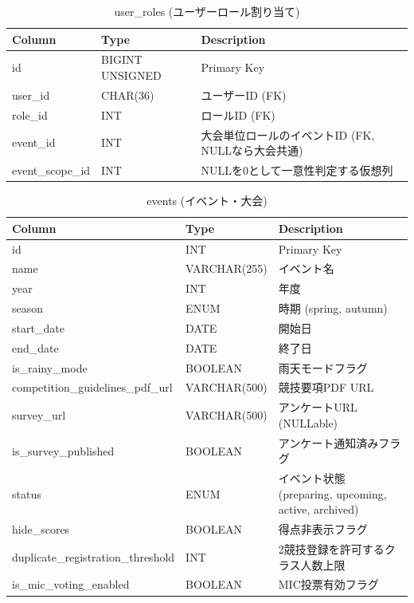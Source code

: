 \documentclass[paper=a4, fontsize=11pt]{jlreq}
\begin{document}
\begin{table}[H]
    \centering
    \caption{user\_roles (ユーザーロール割り当て)}
    \begin{tabularx}{\textwidth}{|l|l|X|}
        \toprule
        Column & Type & Description \\
        \midrule
        id & BIGINT UNSIGNED & Primary Key \\
        user\_id & CHAR(36) & ユーザーID (FK) \\
        role\_id & INT & ロールID (FK) \\
        event\_id & INT & 大会単位ロールのイベントID (FK, NULLなら大会共通) \\
        event\_scope\_id & INT & NULLを0として一意性判定する仮想列 \\
        \bottomrule
    \end{tabularx}
\end{table}

\begin{table}[H]
    \centering
    \caption{events (イベント・大会)}
    \begin{tabularx}{\textwidth}{|l|l|X|}
        \toprule
        Column & Type & Description \\
        \midrule
        id & INT & Primary Key \\
        name & VARCHAR(255) & イベント名 \\
        year & INT & 年度 \\
        season & ENUM & 時期 (spring, autumn) \\
        start\_date & DATE & 開始日 \\
        end\_date & DATE & 終了日 \\
        is\_rainy\_mode & BOOLEAN & 雨天モードフラグ \\
        competition\_guidelines\_pdf\_url & VARCHAR(500) & 競技要項PDF URL \\
        survey\_url & VARCHAR(500) & アンケートURL (NULLable) \\
        is\_survey\_published & BOOLEAN & アンケート通知済みフラグ \\
        status & ENUM & イベント状態 (preparing, upcoming, active, archived) \\
        hide\_scores & BOOLEAN & 得点非表示フラグ \\
        duplicate\_registration\_threshold & INT & 2競技登録を許可するクラス人数上限 \\
        is\_mic\_voting\_enabled & BOOLEAN & MIC投票有効フラグ \\
        \bottomrule
    \end{tabularx}
\end{table}
\end{document}
